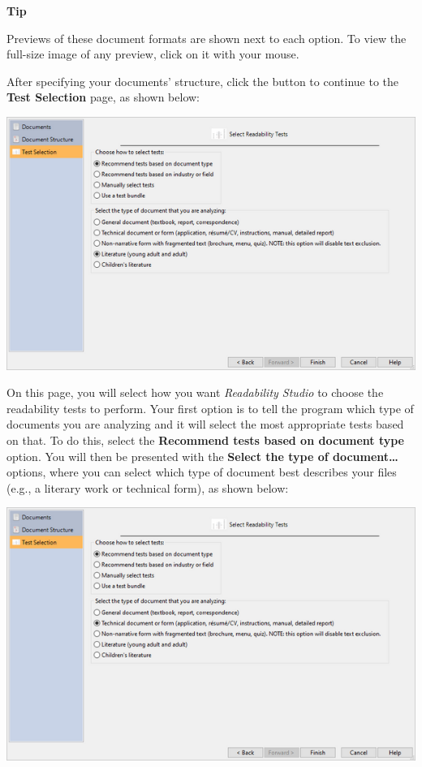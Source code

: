 \documentclass[
]{book}
\newenvironment{tipsection}
    {
    \begin{tcolorbox}[colframe=lightgray,colback=lightyellow,arc=3mm]
    \faLightbulb[regular] \textbf{Tip} \newline
    }
    {
    \end{tcolorbox}
    }
\theoremstyle{definition}
\theoremstyle{definition}
\theoremstyle{definition}
\theoremstyle{definition}
\theoremstyle{remark}
\begin{document}
\begin{tipsection}
Previews of these document formats are shown next to each option. To view the full-size image of any preview, click on it with your mouse.

\end{tipsection}

After specifying your documents' structure, click the  button to continue to the \textbf{Test Selection} page, as shown below:

\includegraphics{Images/wizardbatchreadabilitymethods.png}

On this page, you will select how you want \emph{Readability Studio} to choose the readability tests to perform. Your first option is to tell the program which type of documents you are analyzing and it will select the most appropriate tests based on that. To do this, select the \textbf{Recommend tests based on document type} option. You will then be presented with the \textbf{Select the type of document\ldots{}} options, where you can select which type of document best describes your files (e.g., a literary work or technical form), as shown below:

\includegraphics{Images/wizardbatchdoctype.png}
\end{document}
